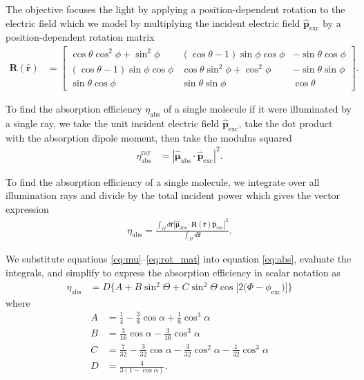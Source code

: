 \documentclass[10pt]{article}
\providecommand{\mb}[1]{\mathbf{#1}}
\providecommand{\mh}[1]{\mathbf{\hat{#1}}}
\providecommand{\bs}[1]{\boldsymbol{#1}}
\begin{document}
  The objective focuses the light by applying a position-dependent rotation to
  the electric field which we model by multiplying the incident electric field
  $\hat{\mb{p}}_{\text{exc}}$ by a position-dependent rotation matrix
  \begin{align}
  \mb{R}(\mh{r}) &= \begin{bmatrix} \cos\theta\cos^2\phi + \sin^2\phi & (\cos\theta -1)\sin\phi\cos\phi & -\sin\theta\cos\phi\\ (\cos\theta - 1)\sin\phi\cos\phi & \cos\theta\sin^2\phi + \cos^2\phi & -\sin\theta\sin\phi \\ \sin\theta\cos\phi& \sin\theta\sin\phi & \cos\theta \end{bmatrix} \label{eq:rot_mat}.
  \end{align}

  To find the absorption efficiency $\eta_{\text{abs}}$ of a single molecule if
  it were illuminated by a single ray, we take the unit incident electric field
  $\hat{\mb{p}}_{\text{exc}}$, take the dot product with the absorption dipole
  moment, then take the modulus squared
    \begin{align}
      \eta_{\text{abs}}^{\text{ray}} &= |\hat{\bs{\mu}}_{\text{abs}}\cdot\mh{p}_{\text{exc}}|^2. \label{eq:singleray}
    \end{align}

    To find the absorption efficiency of a single molecule, we integrate over
    all illumination rays and divide by the total incident power which gives the
    vector expression
\begin{align}
  \eta_{\text{abs}} = \frac{\int_{\Omega}d\mh{r}|\hat{\bs{\mu}}_{\text{abs}}\cdot\mb{R}(\mh{r})\mh{p}_{\text{exc}}|^2}{\int_{\Omega}d\mh{r}}\label{eq:abs}. 
\end{align}

We substitute equations \ref{eq:mu}--\ref{eq:rot_mat} into equation
\ref{eq:abs}, evaluate the integrals, and simplify to express the absorption
efficiency in scalar notation as
\begin{align}
  \eta_{\text{abs}} &= D\{A + B\sin^{2}{\Theta} + C\sin^{2}{\Theta} \cos{[2 (\Phi - \phi_{\text{exc}}})]\}\label{eq:scalarabs}
\end{align}
where
\begin{subequations}
\begin{align}
  A &= \frac{1}{4} - \frac{3}{8} \cos{\alpha } + \frac{1}{8} \cos^{3}{\alpha }\\
  B &= \frac{3}{16} \cos{\alpha } - \frac{3}{16} \cos^{3}{\alpha }\\
  C &= \frac{7}{32} - \frac{3}{32} \cos{\alpha } - \frac{3}{32} \cos^{2}{\alpha } - \frac{1}{32} \cos^{3}{\alpha}\\
  D &= \frac{4}{3(1 - \cos\alpha)}.
\end{align}\label{eq:coefficients}%
\end{subequations}
\end{document}
